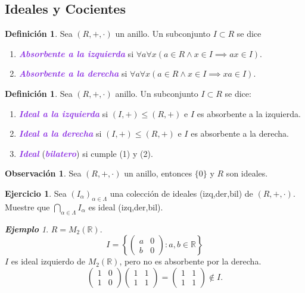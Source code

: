 \documentclass{article}
\theoremstyle{definition}
\newtheorem{definition}[theorem]{Definición}
\newtheorem{exercise}{Ejercicio}
\newtheorem*{obs}{Observación}
\theoremstyle{remark}
\newtheorem{example}[theorem]{\textbf{Ejemplo}}
\numberwithin{equation}{section}
\newcommand{\R}{\mathbb{R}}
\renewcommand{\a}{\alpha}
\renewcommand{\c}{\cdot}
\newcommand{\set}[1]{\left\{ #1 \right\}}
\newcommand{\matr}[1]{\begin{pmatrix}#1\end{pmatrix}}
\newcommand{\ds}{\displaystyle}
\newcommand{\wea}[1]{\textcolor{BlueViolet}{\textbf{\emph{#1}}}}
\begin{document}
\subsection{Ideales y Cocientes}

\begin{definition}
  Sea $(R,+,\c)$ un anillo. Un subconjunto $I \subset R$ se dice
  \begin{enumerate}[(1)]
    \item \wea{Absorbente a la izquierda} si $\forall a \forall x (a \in R \land x \in I \implies ax \in I)$.
    \item \wea{Absorbente a la derecha} si $\forall a \forall x (a \in R \land x \in I \implies xa \in I)$.
  \end{enumerate}
\end{definition}

\begin{definition}
  Sea $(R,+,\c)$ anillo. Un subconjunto $I \subset R$ se dice: 
  \begin{enumerate}[(1)]
    \item \wea{Ideal a la izquierda} si $(I,+) \leqslant (R,+)$ e $I$ es absorbente a la izquierda.
    \item \wea{Ideal a la derecha} si $(I,+) \leqslant (R,+)$ e $I$ es absorbente a la derecha.
    \item \wea{Ideal} (\wea{bilatero}) si cumple (1) y (2).
  \end{enumerate}
\end{definition}

\begin{obs}
  Sea $(R,+,\c)$ un anillo, entonces $\{0\}$ y $R$ son ideales.
\end{obs}

\begin{exercise}
  Sea $(I_\a)_{\a \in \Lambda}$ una colección de ideales (izq,der,bil) de $(R,+,\c)$. Muestre que $\ds \bigcap_{\a \in \Lambda} I_\a$ es ideal (izq,der,bil).
\end{exercise}

\begin{example}
  $R = M_2(\R)$. 
  \[ I = \set{\matr{a & 0 \\ b & 0} \colon a,b \in \R} \]
  $I$ es ideal izquierdo de $M_2(\R)$, pero no es absorbente por la derecha. 
  \[ \matr{1&0\\1&0} \matr{1&1\\1&1} = \matr{1&1\\1&1} \notin I. \]
\end{example}
\end{document}
